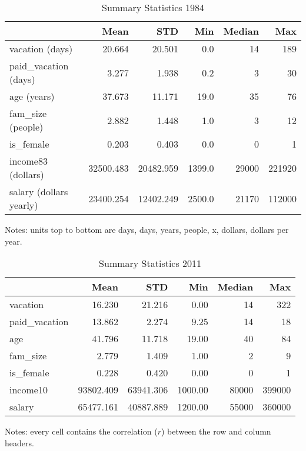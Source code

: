 \documentclass{article}
\begin{document}
    \setlength{\extrarowheight}{3pt}
    \begin{table}[h]
    \centering
    \hspace*{-1.5cm}
    \begin{tabular}{l|r|r|r|r|r}
                              &      Mean &       STD &    Min & Median &    Max \\ \hline
      vacation (days)         &    20.664 &    20.501 &    0.0 &     14 &    189 \\ \hline
      paid\_vacation (days)   &     3.277 &     1.938 &    0.2 &      3 &     30 \\ \hline
      age (years)             &    37.673 &    11.171 &   19.0 &     35 &     76 \\ \hline
      fam\_size (people)      &     2.882 &     1.448 &    1.0 &      3 &     12 \\ \hline
      is\_female              &     0.203 &     0.403 &    0.0 &      0 &      1 \\ \hline
      income83 (dollars)      & 32500.483 & 20482.959 & 1399.0 &  29000 & 221920 \\ \hline
      salary (dollars yearly) & 23400.254 & 12402.249 & 2500.0 &  21170 & 112000
    \end{tabular}
    \hspace*{-1.5cm}
    \caption{Summary Statistics 1984}
    \label{1984-summary}
      Notes: units top to bottom are days, days, years, people, x, dollars, dollars per year.
    \end{table}
    \setlength{\extrarowheight}{3pt}
    \begin{table}[h]
    \centering
    \hspace*{-1.5cm}
    \begin{tabular}{l|r|r|r|r|r}
                     &      Mean &       STD &     Min & Median &    Max \\ \hline
      vacation       &    16.230 &    21.216 &    0.00 &     14 &    322 \\ \hline
      paid\_vacation &    13.862 &     2.274 &    9.25 &     14 &     18 \\ \hline
      age            &    41.796 &    11.718 &   19.00 &     40 &     84 \\ \hline
      fam\_size      &     2.779 &     1.409 &    1.00 &      2 &      9 \\ \hline
      is\_female     &     0.228 &     0.420 &    0.00 &      0 &      1 \\ \hline
      income10       & 93802.409 & 63941.306 & 1000.00 &  80000 & 399000 \\ \hline
      salary         & 65477.161 & 40887.889 & 1200.00 &  55000 & 360000
    \end{tabular}
    \hspace*{-1.5cm}
    \caption{Summary Statistics 2011}
    \label{2011-summary}
      Notes: every cell contains the correlation ($r$) between the row and column headers.
    \end{table}
\end{document}
